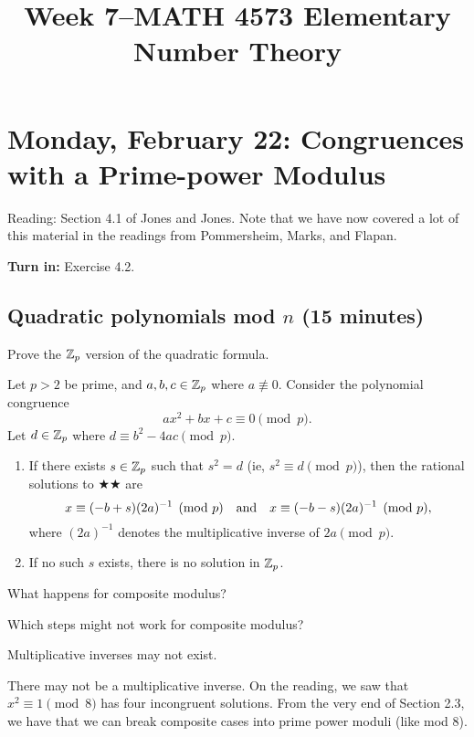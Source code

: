 \documentclass[letterpaper, 11 pt]{article}
\title{Week 7--MATH 4573 Elementary Number Theory}
\begin{document}
\maketitle
\tableofcontents
\section{Monday, February 22: Congruences with a Prime-power Modulus}

Reading: Section 4.1 of Jones and Jones. Note that we have now covered a lot of this material in the readings from Pommersheim, Marks, and Flapan.

{\bf Turn in:} Exercise 4.2.
\subsection{Quadratic polynomials mod $n$ (15 minutes)}

\begin{br}
Prove the $\mathbb Z_p$ version of the quadratic  formula. 

 Let $p>2$ be prime, and $a,b,c\in\mathbb Z_p$ where $a\not\equiv 0$. Consider the polynomial congruence \[ax^2+bx+c\equiv0\pmod p.\tag{$\bigstar\bigstar$}\] Let $d\in \mathbb Z_p$ where $d\equiv b^2-4ac \pmod p$. 
\begin{enumerate}
 \item If there exists $s\in\mathbb Z_p$ such that $s^2=d$ (ie, $s^2\equiv d\pmod p$), then the rational solutions to $\bigstar\bigstar$ are \[x\equiv(-b+s)(2a)^{-1}\pmod p\quad\textnormal{and}\quad x\equiv(-b-s)(2a)^{-1}\pmod p,\] where $(2a)^{-1}$ denotes the multiplicative inverse of $2a \pmod p$.%
 \item If no such $s$ exists, there is no solution in $\mathbb Z_p$.
\end{enumerate}

\end{br}

What happens for composite modulus? 
\begin{cb}
Which steps might not work for composite modulus?\end{cb}
\begin{solution}
 Multiplicative inverses may not exist.
\end{solution}
There may not be a multiplicative inverse. On the reading, we saw that $x^2\equiv 1 \pmod 8$ has four incongruent solutions. From the very end of Section 2.3, we have that we can break composite cases into prime power moduli (like mod 8).
\end{document}

